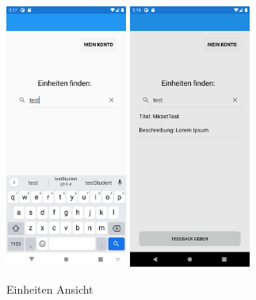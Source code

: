 \begin{figure}[h]
    \begin{center}
    \includegraphics[width=4cm]{pics/Xamarin Student/8 Einheit finden.png}\hfill
    \includegraphics[width=4cm]{pics/Xamarin Student/9 Einheit gefunden.png}
    \caption[HomePage]{Einheiten Ansicht}
    \end{center}
\end{figure}
\newpage

